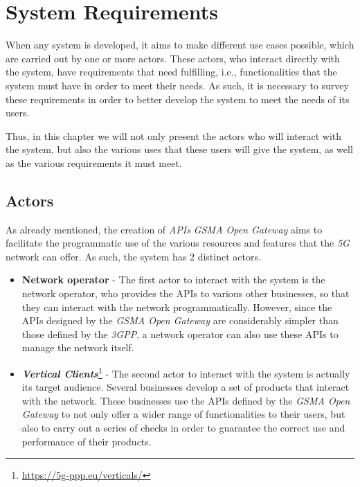 \chapter{System Requirements}

When any system is developed, it aims to make different use cases possible,
which are carried out by one or more actors. These actors, who interact
directly with the system, have requirements that need fulfilling, i.e.,
functionalities that the system must have in order to meet their needs. As
such, it is necessary to survey these requirements in order to better develop
the system to meet the needs of its users.

Thus, in this chapter we will not only present the actors who will interact
with the system, but also the various uses that these users will give the
system, as well as the various requirements it must meet.

\section{Actors}

As already mentioned, the creation of \emph{APIs GSMA Open Gateway} aims to
facilitate the programmatic use of the various resources and features that the
\emph{5G} network can offer. As such, the system has 2 distinct actors.
\begin{itemize}
  \item \textbf{Network operator} - The first actor to interact with the system
    is the network operator, who provides the APIs to various other businesses,
    so that they can interact with the network programmatically. However, since
    the APIs designed by the \emph{GSMA Open Gateway} are considerably simpler
    than those defined by the \emph{3GPP}, a network operator can also use
    these APIs to manage the network itself.

\item \textbf{\emph{Vertical
  Clients}}\footnote{\url{https://5g-ppp.eu/verticals/}} - The second actor to
    interact with the system is actually its target audience. Several
    businesses develop a set of products that interact with the network. These
    businesses use the APIs defined by the \emph{GSMA Open Gateway} to not only
    offer a wider range of functionalities to their users, but also to carry
    out a series of checks in order to guarantee the correct use and
    performance of their products.
\end{itemize}


